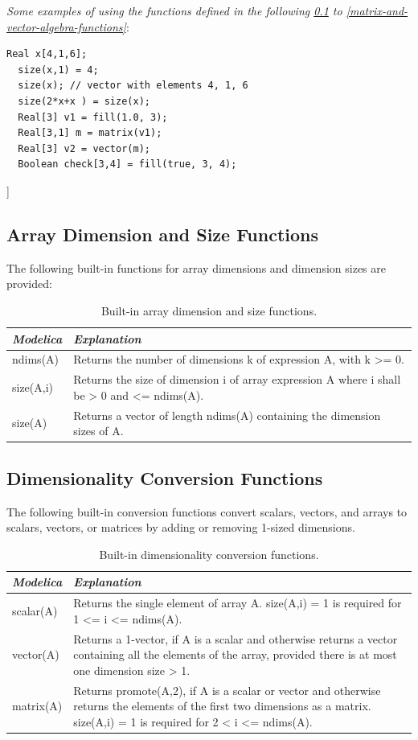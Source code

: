 \documentclass[10pt,a4paper]{report}
\def\doublelabel#1{\label{#1}}
\begin{document}
\emph{Some examples of using the functions defined in the following
\ref{array-dimension-and-size-functions} to \ref{matrix-and-vector-algebra-functions}}:

\begin{lstlisting}[language=modelica]
  Real x[4,1,6];
  size(x,1) = 4;
  size(x); // vector with elements 4, 1, 6
  size(2*x+x ) = size(x);
  Real[3] v1 = fill(1.0, 3);
  Real[3,1] m = matrix(v1);
  Real[3] v2 = vector(m);
  Boolean check[3,4] = fill(true, 3, 4);
\end{lstlisting}
{]}

\subsection{Array Dimension and Size Functions}\doublelabel{array-dimension-and-size-functions}

The following built-in functions for array dimensions and dimension
sizes are provided:

\begin{longtable}[]{|l|p{9cm}|}
\caption{Built-in array dimension and size functions.}\\
\hline
\emph{Modelica} & \emph{Explanation}\\ \hline
\endhead
ndims(A) & 
Returns the number of dimensions k of expression A, with k
\textgreater{}= 0.
\\ \hline
size(A,i) &
Returns the size of dimension i of array expression A where i shall be
\textgreater{} 0 and \textless{}= ndims(A).\\ \hline
size(A) &
Returns a vector of length ndims(A) containing the dimension sizes of
A.\\ \hline
\end{longtable}

\subsection{Dimensionality Conversion Functions}\doublelabel{dimensionality-conversion-functions}

The following built-in conversion functions convert scalars, vectors,
and arrays to scalars, vectors, or matrices by adding or removing
1-sized dimensions.

\begin{longtable}[]{|l|p{9cm}|}
\caption{Built-in dimensionality conversion functions.}\\
\hline
\emph{Modelica} & \emph{Explanation}\\ \hline
\endhead
scalar(A) & Returns the single element of array A. size(A,i) = 1 is required for 1
\textless{}= i \textless{}= ndims(A).\\ \hline
vector(A)
& 
Returns a 1-vector, if A is a scalar and otherwise returns a vector
containing all the elements of the array, provided there is at most one
dimension size \textgreater{} 1.\\ \hline
matrix(A)
& 
Returns promote(A,2), if A is a scalar or vector and otherwise returns
the elements of the first two dimensions as a matrix. size(A,i) = 1 is
required for 2 \textless{} i \textless{}= ndims(A).\\ \hline
\end{longtable}
\end{document}

